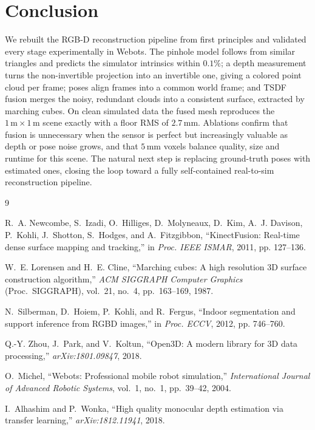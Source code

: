 \documentclass[11pt,a4paper]{article}
\begin{document}
\section{Conclusion}

We rebuilt the RGB-D reconstruction pipeline from first principles and
validated every stage experimentally in Webots. The pinhole model follows from
similar triangles and predicts the simulator intrinsics within $0.1\%$; a depth
measurement turns the non-invertible projection into an invertible one, giving
a colored point cloud per frame; poses align frames into a common world frame;
and TSDF fusion merges the noisy, redundant clouds into a consistent surface,
extracted by marching cubes. On clean simulated data the fused mesh reproduces
the $1\,\mathrm{m}\times1\,\mathrm{m}$ scene exactly with a floor RMS of
$2.7\,\mathrm{mm}$. Ablations confirm that fusion is unnecessary when the
sensor is perfect but increasingly valuable as depth or pose noise grows, and
that $5\,\mathrm{mm}$ voxels balance quality, size and runtime for this scene.
The natural next step is replacing ground-truth poses with estimated ones,
closing the loop toward a fully self-contained real-to-sim reconstruction
pipeline.

\begin{thebibliography}{9}

R.~A. Newcombe, S.~Izadi, O.~Hilliges, D.~Molyneaux, D.~Kim, A.~J. Davison,
P.~Kohli, J.~Shotton, S.~Hodges, and A.~Fitzgibbon,
``KinectFusion: Real-time dense surface mapping and tracking,''
in \emph{Proc. IEEE ISMAR}, 2011, pp. 127--136.

W.~E. Lorensen and H.~E. Cline,
``Marching cubes: A high resolution 3D surface construction algorithm,''
\emph{ACM SIGGRAPH Computer Graphics} (Proc.\ SIGGRAPH), vol.~21, no.~4,
pp.~163--169, 1987.

N.~Silberman, D.~Hoiem, P.~Kohli, and R.~Fergus,
``Indoor segmentation and support inference from RGBD images,''
in \emph{Proc. ECCV}, 2012, pp. 746--760.

Q.-Y. Zhou, J.~Park, and V.~Koltun,
``Open3D: A modern library for 3D data processing,''
\emph{arXiv:1801.09847}, 2018.

O.~Michel,
``Webots: Professional mobile robot simulation,''
\emph{International Journal of Advanced Robotic Systems}, vol.~1, no.~1,
pp.~39--42, 2004.

I.~Alhashim and P.~Wonka,
``High quality monocular depth estimation via transfer learning,''
\emph{arXiv:1812.11941}, 2018.

\end{thebibliography}
\end{document}
